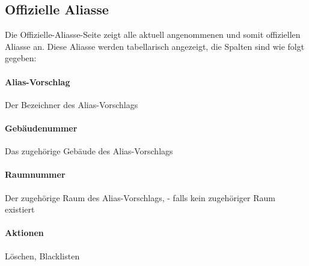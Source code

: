 \subsection{Offizielle Aliasse}

Die Offizielle-Aliasse-Seite zeigt alle aktuell angenommenen und somit offiziellen Aliasse an.
Diese Aliasse werden tabellarisch angezeigt, die Spalten sind wie folgt gegeben:

\paragraph*{Alias-Vorschlag} 
    Der Bezeichner des Alias-Vorschlags
\paragraph*{Gebäudenummer} 
    Das zugehörige Gebäude des Alias-Vorschlags
\paragraph*{Raumnummer} 
    Der zugehörige Raum des Alias-Vorschlags, \dq - \dq{} falls kein zugehöriger Raum existiert
\paragraph*{Aktionen} 
    Löschen, Blacklisten